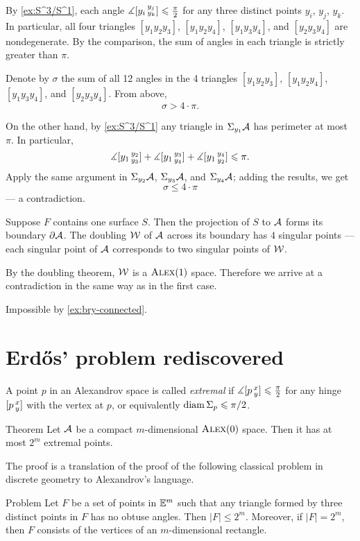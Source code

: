 By \ref{ex:S^3/S^1}, each angle $\measuredangle[y_i\,{}^{y_j}_{y_k}]\leqslant \tfrac\pi2$ for any three distinct points 
$y_i$, $y_j$, $y_k$.
In particular, all four triangles $[y_1y_2y_3]$, $[y_1y_2y_4]$, $[y_1y_3y_4]$, and $[y_2y_3y_4]$ are nondegenerate.
By the comparison, the sum of angles in each triangle is strictly greater than $\pi$.

Denote by $\sigma$ the sum of all 12 angles in the 4 triangles $[y_1y_2y_3]$, $[y_1y_2y_4]$, $[y_1y_3y_4]$, and $[y_2y_3y_4]$.
From above,
\[\sigma>4\cdot\pi.\]

On the other hand, by \ref{ex:S^3/S^1} any triangle in $\Sigma_{y_1}\mathcal{A}$ has perimeter at most $\pi$.
In particular, 
\[\measuredangle[y_1\,{}^{y_2}_{y_3}]+\measuredangle[y_1\,{}^{y_3}_{y_4}]+\measuredangle[y_1\,{}^{y_4}_{y_2}]\leqslant \pi.\]
Apply the same argument in $\Sigma_{y_2}\mathcal{A}$, $\Sigma_{y_3}\mathcal{A}$, and $\Sigma_{y_4}\mathcal{A}$;
adding the results, we get 
\[\sigma\le 4\cdot\pi\]
--- a contradiction.

Suppose $F$ contains one surface $S$.
Then the projection of $S$ to $\mathcal{A}$ forms its boundary $\partial \mathcal{A}$.
The doubling $\mathcal{W}$ of $\mathcal{A}$ across its boundary has 4 singular points --- each singular point of $\mathcal{A}$ corresponds to two singular points of $\mathcal{W}$.

By the doubling theorem, $\mathcal{W}$ is a $\textsc{Alex}(1)$ space.
Therefore we arrive at a contradiction in the same way as in the first case.

 Impossible by \ref{ex:bry-connected}.
\qeds

\section{Erdős' problem rediscovered}

A point $p$ in an Alexandrov space is called \emph{extremal} if $\measuredangle[p\,{}^{x}_{y}]\leqslant \tfrac\pi2$ for any hinge $[p\,{}^{x}_{y}]$ with the vertex at $p$, or equivalently $\operatorname{\rm diam}\nolimits \Sigma_p\leqslant \pi/2$.

\begin{thm}{Theorem}\label{thm:extr-point}
Let $\mathcal{A}$ be a compact $m$-dimensional $\textsc{Alex}(0)$ space.
Then it has at most $2^m$ extremal points.
\end{thm}

The proof is a translation of the proof of the following classical problem in discrete geometry to Alexandrov's language.

\begin{thm}{Problem}\label{erdos-problem}
Let $F$ be a set of points in $\mathbb{E}^m$ such that any triangle formed by three distinct points in $F$ has no obtuse angles.
Then  $|F|\le2^m$.
Moreover, if $|F|=2^m$, then $F$ consists of the vertices of an $m$-dimensional rectangle.
\end{thm}

